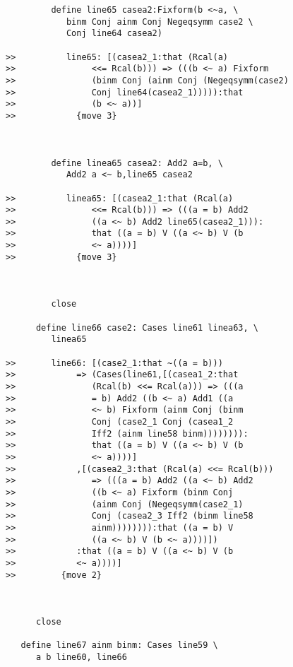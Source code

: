\documentclass[12pt]{article}
\begin{document}
\begin{verbatim}
         define line65 casea2:Fixform(b <~a, \
            binm Conj ainm Conj Negeqsymm case2 \
            Conj line64 casea2)

>>          line65: [(casea2_1:that (Rcal(a)
>>               <<= Rcal(b))) => (((b <~ a) Fixform
>>               (binm Conj (ainm Conj (Negeqsymm(case2)
>>               Conj line64(casea2_1))))):that
>>               (b <~ a))]
>>            {move 3}



         define linea65 casea2: Add2 a=b, \
            Add2 a <~ b,line65 casea2

>>          linea65: [(casea2_1:that (Rcal(a)
>>               <<= Rcal(b))) => (((a = b) Add2
>>               ((a <~ b) Add2 line65(casea2_1))):
>>               that ((a = b) V ((a <~ b) V (b
>>               <~ a))))]
>>            {move 3}



         close

      define line66 case2: Cases line61 linea63, \
         linea65

>>       line66: [(case2_1:that ~((a = b)))
>>            => (Cases(line61,[(casea1_2:that
>>               (Rcal(b) <<= Rcal(a))) => (((a
>>               = b) Add2 ((b <~ a) Add1 ((a
>>               <~ b) Fixform (ainm Conj (binm
>>               Conj (case2_1 Conj (casea1_2
>>               Iff2 (ainm line58 binm)))))))):
>>               that ((a = b) V ((a <~ b) V (b
>>               <~ a))))]
>>            ,[(casea2_3:that (Rcal(a) <<= Rcal(b)))
>>               => (((a = b) Add2 ((a <~ b) Add2
>>               ((b <~ a) Fixform (binm Conj
>>               (ainm Conj (Negeqsymm(case2_1)
>>               Conj (casea2_3 Iff2 (binm line58
>>               ainm)))))))):that ((a = b) V
>>               ((a <~ b) V (b <~ a))))])
>>            :that ((a = b) V ((a <~ b) V (b
>>            <~ a))))]
>>         {move 2}



      close

   define line67 ainm binm: Cases line59 \
      a b line60, line66


\end{verbatim}
\end{document}
